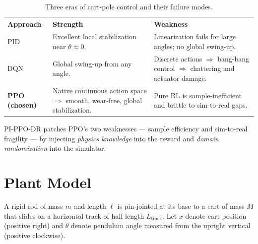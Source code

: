\documentclass[11pt,a4paper]{article}
\begin{document}
\begin{table}[h]
\centering
\caption{Three eras of cart-pole control and their failure modes.}
\label{tab:era}
\begin{tabularx}{\linewidth}{l X X}
\toprule
\textbf{Approach} & \textbf{Strength} & \textbf{Weakness} \\
\midrule
PID & Excellent local stabilization near $\theta \approx 0$.
    & Linearization fails for large angles; no global swing-up. \\
DQN & Global swing-up from any angle.
    & Discrete actions $\Rightarrow$ bang-bang control $\Rightarrow$
      chattering and actuator damage. \\
\textbf{PPO (chosen)}
    & Native continuous action space $\Rightarrow$ smooth, wear-free,
      global stabilization.
    & Pure RL is sample-inefficient and brittle to sim-to-real gaps. \\
\bottomrule
\end{tabularx}
\end{table}

\noindent PI-PPO-DR patches PPO's two weaknesses --- sample efficiency and
sim-to-real fragility --- by injecting \emph{physics knowledge} into the
reward and \emph{domain randomization} into the simulator.

\section{Plant Model}

A rigid rod of mass $m$ and length $\ell$ is pin-jointed at its base to a cart of mass $M$ that slides on a horizontal track of half-length $L_{\text{track}}$. Let $x$ denote cart position (positive right) and $\theta$ denote pendulum angle measured from the upright vertical (positive clockwise).
\end{document}
